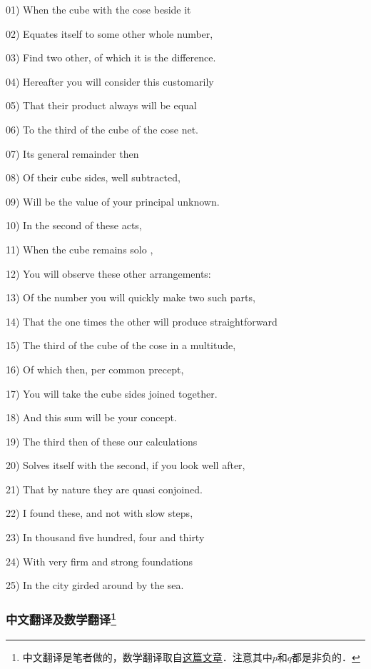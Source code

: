 01) When the cube with the cose beside it 

02) Equates itself to some other whole number,

03) Find two other, of which it is the difference. 

04) Hereafter you will consider this customarily

05) That their product always will be equal 

06) To the third of the cube of the cose net. 

07) Its general remainder then

08) Of their cube sides, well subtracted, 

09) Will be the value of your principal unknown.

10) In the second of these acts,

11) When the cube remains solo , 

12) You will observe these other arrangements:

13) Of the number you will quickly make two such parts,

14) That the one times the other will produce straightforward 

15) The third of the cube of the cose in a multitude, 

16) Of which then, per common precept,

17) You will take the cube sides joined together. 

18) And this sum will be your concept. 

19) The third then of these our calculations 

20) Solves itself with the second, if you look well after,

21) That by nature they are quasi conjoined.

22) I found these, and not with slow steps,

23) In thousand five hundred, four and thirty

24) With very firm and strong foundations

25) In the city girded around by the sea.


\subsubsection{中文翻译及数学翻译\footnote{中文翻译是笔者做的，数学翻译取自\href{https://www.maa.org/press/periodicals/convergence/how-tartaglia-solved-the-cubic-equation-tartaglias-poem}{这篇文章}．注意其中$p$和$q$都是非负的．}}

